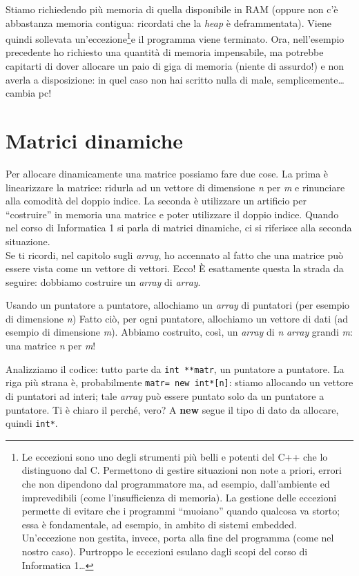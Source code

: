 \begin{itemize}
Stiamo richiedendo più memoria di quella disponibile in RAM (oppure non c'è abbastanza memoria contigua: ricordati che la \emph{heap} è deframmentata). Viene quindi sollevata un'eccezione\footnote{Le eccezioni sono uno degli strumenti più belli e potenti del C++ che lo distinguono dal C. Permettono di gestire situazioni non note a priori, errori che non dipendono dal programmatore ma, ad esempio, dall'ambiente ed imprevedibili (come l'insufficienza di memoria). La gestione delle eccezioni permette di evitare che i programmi ``muoiano'' quando qualcosa va storto; essa è fondamentale, ad esempio, in ambito di sistemi embedded. Un'eccezione non gestita, invece, porta alla fine del programma (come nel nostro caso). Purtroppo le eccezioni esulano dagli scopi del corso di Informatica 1\ldots}e il programma viene terminato. Ora, nell'esempio precedente ho richiesto una quantità di memoria impensabile, ma potrebbe capitarti di dover allocare un paio di giga di memoria (niente di assurdo!) e non averla a disposizione: in quel caso non hai scritto nulla di male, semplicemente\ldots cambia pc!
\end{itemize}
 \section{Matrici dinamiche} 
 Per allocare dinamicamente una matrice possiamo fare due cose. La prima è linearizzare la matrice: ridurla ad un vettore di dimensione \emph{n} per \emph{m} e rinunciare alla comodità del doppio indice. La seconda è utilizzare un artificio per ``costruire'' in memoria una matrice e poter utilizzare il doppio indice. Quando nel corso di Informatica 1 si parla di matrici dinamiche, ci si riferisce alla seconda situazione.\\
 
 Se ti ricordi, nel capitolo sugli \emph{array}, ho accennato al fatto che una matrice può essere vista come un vettore di vettori. Ecco! È esattamente questa la strada da seguire: dobbiamo costruire un \emph{array} di \emph{array}. 
 
 Usando un puntatore a puntatore, allochiamo un \emph{array} di puntatori (per esempio di dimensione \emph{n}) Fatto ciò, per ogni puntatore, allochiamo un vettore di dati (ad esempio di dimensione \emph{m}). Abbiamo costruito, così, un \emph{array} di \emph{n} \emph{array} grandi \emph{m}: una matrice \emph{n} per \emph{m}! 
 
 
 Analizziamo il codice: tutto parte da \lstinline|int **matr|, un puntatore a puntatore. La riga più strana è, probabilmente \lstinline|matr= new int*[n]|: stiamo allocando un vettore di puntatori ad interi; tale \emph{array} può essere puntato solo da un puntatore a puntatore. Ti è chiaro il perché, vero? A \textbf{new} segue il tipo di dato da allocare, quindi \lstinline|int*|. 
 
